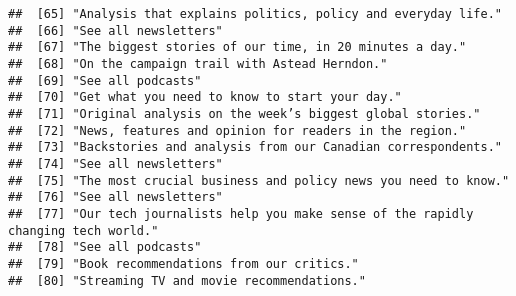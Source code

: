 \documentclass[
]{article}
\begin{document}
\begin{verbatim}
##  [65] "Analysis that explains politics, policy and everyday life."                                                                                               
##  [66] "See all newsletters"                                                                                                                                      
##  [67] "The biggest stories of our time, in 20 minutes a day."                                                                                                    
##  [68] "On the campaign trail with Astead Herndon."                                                                                                               
##  [69] "See all podcasts"                                                                                                                                         
##  [70] "Get what you need to know to start your day."                                                                                                             
##  [71] "Original analysis on the week’s biggest global stories."                                                                                                  
##  [72] "News, features and opinion for readers in the region."                                                                                                    
##  [73] "Backstories and analysis from our Canadian correspondents."                                                                                               
##  [74] "See all newsletters"                                                                                                                                      
##  [75] "The most crucial business and policy news you need to know."                                                                                              
##  [76] "See all newsletters"                                                                                                                                      
##  [77] "Our tech journalists help you make sense of the rapidly changing tech world."                                                                             
##  [78] "See all podcasts"                                                                                                                                         
##  [79] "Book recommendations from our critics."                                                                                                                   
##  [80] "Streaming TV and movie recommendations."                                                                                                                  

\end{verbatim}
\end{document}
